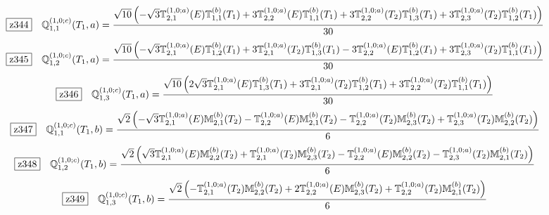 \documentclass[fleqn,10pt,landscape]{jsarticle}
\begin{document}
\begin{dmath*}
\hspace*{3mm}\fbox{z344}\quad \mathbb{Q}_{1,1}^{(1,0;c)}(T_{1},a)=\frac{\sqrt{10} \left(- \sqrt{3} \mathbb{T}_{2,1}^{(1,0;a)}(E) \mathbb{T}_{1,1}^{(b)}(T_{1}) + 3 \mathbb{T}_{2,2}^{(1,0;a)}(E) \mathbb{T}_{1,1}^{(b)}(T_{1}) + 3 \mathbb{T}_{2,2}^{(1,0;a)}(T_{2}) \mathbb{T}_{1,3}^{(b)}(T_{1}) + 3 \mathbb{T}_{2,3}^{(1,0;a)}(T_{2}) \mathbb{T}_{1,2}^{(b)}(T_{1})\right)}{30}
\end{dmath*}
\begin{dmath*}
\hspace*{3mm}\fbox{z345}\quad \mathbb{Q}_{1,2}^{(1,0;c)}(T_{1},a)=\frac{\sqrt{10} \left(- \sqrt{3} \mathbb{T}_{2,1}^{(1,0;a)}(E) \mathbb{T}_{1,2}^{(b)}(T_{1}) + 3 \mathbb{T}_{2,1}^{(1,0;a)}(T_{2}) \mathbb{T}_{1,3}^{(b)}(T_{1}) - 3 \mathbb{T}_{2,2}^{(1,0;a)}(E) \mathbb{T}_{1,2}^{(b)}(T_{1}) + 3 \mathbb{T}_{2,3}^{(1,0;a)}(T_{2}) \mathbb{T}_{1,1}^{(b)}(T_{1})\right)}{30}
\end{dmath*}
\begin{dmath*}
\hspace*{3mm}\fbox{z346}\quad \mathbb{Q}_{1,3}^{(1,0;c)}(T_{1},a)=\frac{\sqrt{10} \left(2 \sqrt{3} \mathbb{T}_{2,1}^{(1,0;a)}(E) \mathbb{T}_{1,3}^{(b)}(T_{1}) + 3 \mathbb{T}_{2,1}^{(1,0;a)}(T_{2}) \mathbb{T}_{1,2}^{(b)}(T_{1}) + 3 \mathbb{T}_{2,2}^{(1,0;a)}(T_{2}) \mathbb{T}_{1,1}^{(b)}(T_{1})\right)}{30}
\end{dmath*}
\begin{dmath*}
\hspace*{3mm}\fbox{z347}\quad \mathbb{Q}_{1,1}^{(1,0;c)}(T_{1},b)=\frac{\sqrt{2} \left(- \sqrt{3} \mathbb{T}_{2,1}^{(1,0;a)}(E) \mathbb{M}_{2,1}^{(b)}(T_{2}) - \mathbb{T}_{2,2}^{(1,0;a)}(E) \mathbb{M}_{2,1}^{(b)}(T_{2}) - \mathbb{T}_{2,2}^{(1,0;a)}(T_{2}) \mathbb{M}_{2,3}^{(b)}(T_{2}) + \mathbb{T}_{2,3}^{(1,0;a)}(T_{2}) \mathbb{M}_{2,2}^{(b)}(T_{2})\right)}{6}
\end{dmath*}
\begin{dmath*}
\hspace*{3mm}\fbox{z348}\quad \mathbb{Q}_{1,2}^{(1,0;c)}(T_{1},b)=\frac{\sqrt{2} \left(\sqrt{3} \mathbb{T}_{2,1}^{(1,0;a)}(E) \mathbb{M}_{2,2}^{(b)}(T_{2}) + \mathbb{T}_{2,1}^{(1,0;a)}(T_{2}) \mathbb{M}_{2,3}^{(b)}(T_{2}) - \mathbb{T}_{2,2}^{(1,0;a)}(E) \mathbb{M}_{2,2}^{(b)}(T_{2}) - \mathbb{T}_{2,3}^{(1,0;a)}(T_{2}) \mathbb{M}_{2,1}^{(b)}(T_{2})\right)}{6}
\end{dmath*}
\begin{dmath*}
\hspace*{3mm}\fbox{z349}\quad \mathbb{Q}_{1,3}^{(1,0;c)}(T_{1},b)=\frac{\sqrt{2} \left(- \mathbb{T}_{2,1}^{(1,0;a)}(T_{2}) \mathbb{M}_{2,2}^{(b)}(T_{2}) + 2 \mathbb{T}_{2,2}^{(1,0;a)}(E) \mathbb{M}_{2,3}^{(b)}(T_{2}) + \mathbb{T}_{2,2}^{(1,0;a)}(T_{2}) \mathbb{M}_{2,1}^{(b)}(T_{2})\right)}{6}
\end{dmath*}
\end{document}
